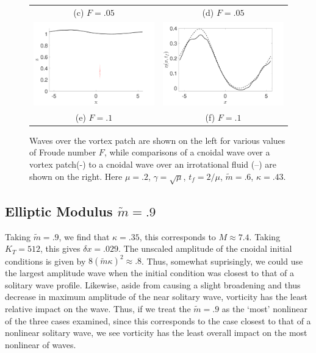 \documentclass[a4paper,11pt]{article}
\begin{document}
\begin{figure}
\begin{tabular}{cc}
(c)  $F=.05$ & (d)  $F=.05$\\
\includegraphics[width=.35\textwidth]{wave_over_vortices_m_pt6_w0_10} & \includegraphics[width=.35\textwidth]{profiles_m_pt6_w0_10}\\
(e)  $F=.1$ & (f)  $F=.1$
\end{tabular}
\caption{Waves over the vortex patch are shown on the left for various values of Froude number $F$, while comparisons of a cnoidal wave over a vortex patch(-) to a cnoidal wave over an irrotational fluid (--) are shown on the right.  Here $\mu=.2$, $\gamma=\sqrt{\mu}$, $t_{f}=2/\mu$, $\tilde{m}=.6$, $\kappa = .43$.}
\label{fig:midsolwave}
\end{figure}
\subsection*{Elliptic Modulus $\tilde{m}=.9$}
Taking $\tilde{m}=.9$, we find that $\kappa = .35$, this corresponds to $M \approx 7.4$.  Taking $K_{T}=512$, this gives $\delta x = .029$.  The unscaled amplitude of the cnoidal initial conditions is given by $8(\tilde{m}\kappa)^{2}\approx .8$.  Thus, somewhat suprisingly, we could use the largest amplitude wave when the initial condition was closest to that of a solitary wave profile.  Likewise, aside from causing a slight broadening and thus decrease in maximum amplitude of the near solitary wave, vorticity has the least relative impact on the wave.  Thus, if we treat the $\tilde{m}=.9$ as the `most' nonlinear of the three cases examined, since this corresponds to the case closest to that of a nonlinear solitary wave, we see vorticity has the least overall impact on the most nonlinear of waves.  
\end{document}
